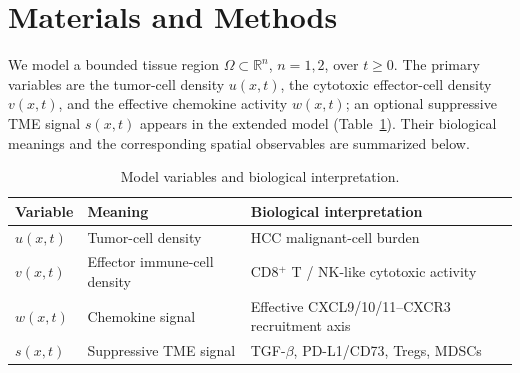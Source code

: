 \documentclass[]{interact}
\theoremstyle{plain}%
\theoremstyle{definition}
\theoremstyle{remark}
\newcommand{\R}{\mathbb{R}}
\newcommand{\Om}{\Omega}
\begin{document}
\section{Materials and Methods}\label{sec:methods}

We model a bounded tissue region $\Om\subset\R^n$, $n=1,2$, over $t\ge0$. The
primary variables are the tumor-cell density $u(x,t)$, the cytotoxic
effector-cell density $v(x,t)$, and the effective chemokine activity $w(x,t)$;
an optional suppressive TME signal $s(x,t)$ appears in the extended model
(Table~\ref{tab:variables_tme}). Their biological meanings and the
corresponding spatial observables are summarized below.

\begin{table}[htbp]
\centering
\caption{Model variables and biological interpretation.}
\label{tab:variables_tme}
\renewcommand{\arraystretch}{1.2}
\begin{tabular}{lll}
\toprule
\textbf{Variable} & \textbf{Meaning} & \textbf{Biological interpretation}\\
\midrule
$u(x,t)$ & Tumor-cell density & HCC malignant-cell burden\\
$v(x,t)$ & Effector immune-cell density & CD8$^+$ T / NK-like cytotoxic activity\\
$w(x,t)$ & Chemokine signal & Effective CXCL9/10/11--CXCR3 recruitment axis\\
$s(x,t)$ & Suppressive TME signal & TGF-$\beta$, PD-L1/CD73, Tregs, MDSCs\\
\bottomrule
\end{tabular}
\end{table}
\end{document}
